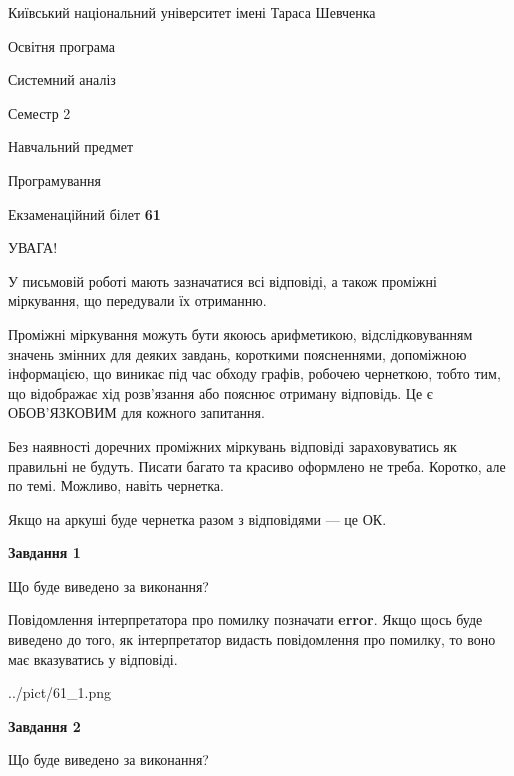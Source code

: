 \documentclass[12pt, ukrainian]{article}
\begin{document}
{{\begin {small}\par
{ \center  Київський національний університет імені Тараса Шевченка \par}
{\parbox {5 cm}{Освітня програма \hfill}{\parbox {7 cm}{Системний аналіз \hfill}}\parbox {6 cm}{\hfill Семестр 2}}\par
{\parbox {5 cm} {Навчальний предмет \hfill}\parbox {7 cm}{Програмування \hfill}\parbox {6cm}{\hfill}\par}\vspace{-7pt} \end{small}}{\center Екзаменаційний білет \No \textbf
{ 61 }\par}}
{
\begin {large}
УВАГА!

У письмовій роботі мають зазначатися всі відповіді, а також проміжні міркування, що передували їх отриманню.

Проміжні міркування можуть бути якоюсь арифметикою, відслідковуванням зна\-чень змінних для деяких завдань,
короткими поясненнями, допоміжною інформацією, що виникає під час обходу графів, робочею чернеткою,
тобто тим, що відображає хід розв’язання або пояснює отриману відповідь.
Це є ОБОВ’ЯЗКОВИМ для кожного запитання.

Без наявності доречних проміжних міркувань відповіді зараховуватись як правиль\-ні не будуть.
Писати багато та красиво оформлено не треба. Коротко, але по темі. Можли\-во, навіть чернетка.

Якщо на аркуші буде чернетка разом з відповідями --- це ОК.

\newpage

{\begin {center}\textbf{Завдання 1}\end {center}}\par
Що буде виведено за виконання?

Повідомлення інтерпретатора про помилку позначати \textbf{error}.
Якщо щось буде виведено до того, як інтерпретатор видасть повідомлення про помилку, 
то воно має вказуватись у відповіді. \par


\begin{center}
	{../pict/61_1.png}
\end{center}
\newpage

{\begin {center}\textbf{Завдання 2}\end {center}}\par
Що буде виведено за виконання?


\end{large}}
\end{document}
